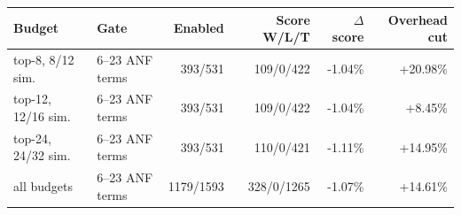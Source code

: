 \begin{tabular}{llrrrr}
\toprule
Budget & Gate & Enabled & Score W/L/T & $\Delta$ score & Overhead cut \\
\midrule
top-8, 8/12 sim. & 6--23 ANF terms & 393/531 & 109/0/422 & -1.04\% & +20.98\% \\
top-12, 12/16 sim. & 6--23 ANF terms & 393/531 & 109/0/422 & -1.04\% & +8.45\% \\
top-24, 24/32 sim. & 6--23 ANF terms & 393/531 & 110/0/421 & -1.11\% & +14.95\% \\
all budgets & 6--23 ANF terms & 1179/1593 & 328/0/1265 & -1.07\% & +14.61\% \\
\bottomrule
\end{tabular}
